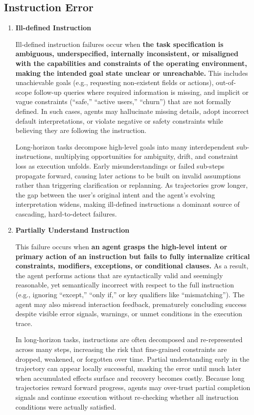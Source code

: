 \documentclass[11pt]{article}
\begin{document}
\subsection{Instruction Error}
\begin{enumerate}
\item \textbf{Ill-defined
Instruction}

Ill-defined instruction failures occur when \textbf{the task specification is ambiguous, underspecified,
internally inconsistent, or misaligned with the capabilities and constraints of the operating
environment, making the intended goal state unclear or unreachable. }
This includes
unachievable goals (e.g., requesting non-existent fields or actions), out-of-scope follow-up
queries where required information is missing, and implicit or vague constraints (“safe,”
“active users,” “churn”) that are not formally defined. In such cases, agents may hallucinate
missing details, adopt incorrect default interpretations, or violate negative or safety
constraints while believing they are following the instruction.

Long-horizon tasks decompose high-level goals into many interdependent sub-instructions,
multiplying opportunities for ambiguity, drift, and constraint loss as execution unfolds. Early
misunderstandings or failed sub-steps propagate forward, causing later actions to be built on
invalid assumptions rather than triggering clarification or replanning. As trajectories grow
longer, the gap between the user’s original intent and the agent’s evolving interpretation
widens, making ill-defined instructions a dominant source of cascading, hard-to-detect failures.

\item \textbf{Partially Understand
Instruction}

This failure occurs when \textbf{an agent grasps the high-level intent or primary action of an
instruction but fails to fully internalize critical constraints, modifiers, exceptions, or conditional
clauses.} As a result, the agent performs actions that are syntactically valid and seemingly
reasonable, yet semantically incorrect with respect to the full instruction (e.g., ignoring
“except,” “only if,” or key qualifiers like “mismatching”). The agent may also misread
interaction feedback, prematurely concluding success despite visible error signals, warnings,
or unmet conditions in the execution trace.

In long-horizon tasks, instructions are often decomposed and re-represented across many
steps, increasing the risk that fine-grained constraints are dropped, weakened, or forgotten
over time. Partial understanding early in the trajectory can appear locally successful, masking
the error until much later when accumulated effects surface and recovery becomes costly.
Because long trajectories reward forward progress, agents may over-trust partial completion
signals and continue execution without re-checking whether all instruction conditions were
actually satisfied.
\end{enumerate}
\end{document}
